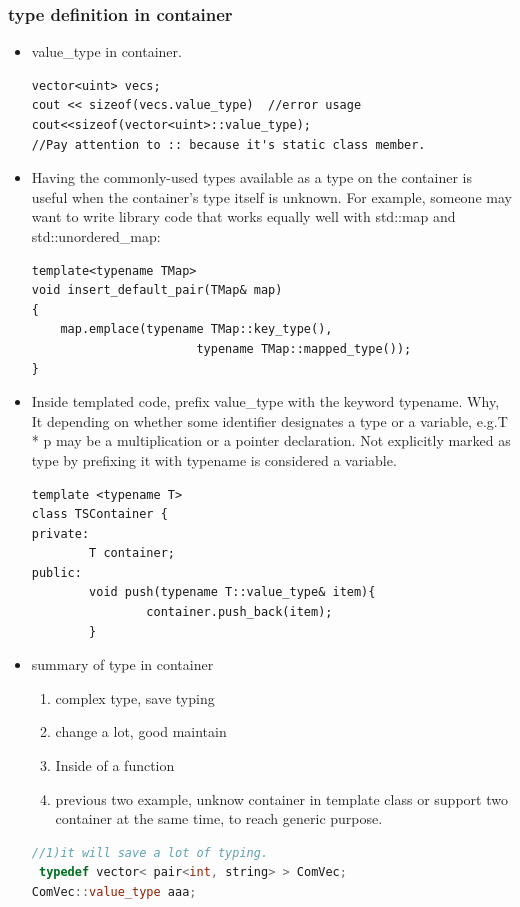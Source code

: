 \documentclass[a4paper,11pt,twoside]{book}
\begin{document}
\subsubsection{type definition in container}
\begin{itemize}
\item value\_type in container.
\begin{lstlisting}[numbers=none]
vector<uint> vecs;
cout << sizeof(vecs.value_type)  //error usage
cout<<sizeof(vector<uint>::value_type);
//Pay attention to :: because it's static class member.
\end{lstlisting}

\item Having the commonly-used types available as a type on the container is useful when the container's type itself is unknown. For example, someone may want to write library code that works equally well with std::map and std::unordered\_map:
\begin{lstlisting}[numbers=none]
template<typename TMap>
void insert_default_pair(TMap& map)
{
    map.emplace(typename TMap::key_type(),
                       typename TMap::mapped_type());
}
\end{lstlisting}

\item Inside templated code, prefix value\_type with the keyword typename. Why, It depending on whether some identifier designates a type or a variable, e.g.T * p may be a multiplication or a pointer declaration. Not explicitly marked as type by prefixing it with typename is considered a variable.

\begin{lstlisting}[numbers=none]
template <typename T>
class TSContainer {
private:
        T container;
public:
        void push(typename T::value_type& item){
                container.push_back(item);
        }
\end{lstlisting}


\item summary of type in container
\begin{enumerate}
\item complex type, save typing
\item change a lot, good maintain
\item Inside of a function
\item previous two example, unknow container in template class or support two container at the same time, to reach generic purpose.
\end{enumerate}
\begin{lstlisting}[frame=single, language=c++, mathescape=true]
//1)it will save a lot of typing.
 typedef vector< pair<int, string> > ComVec;
ComVec::value_type aaa;


\end{lstlisting}
\end{itemize}
\end{document}
